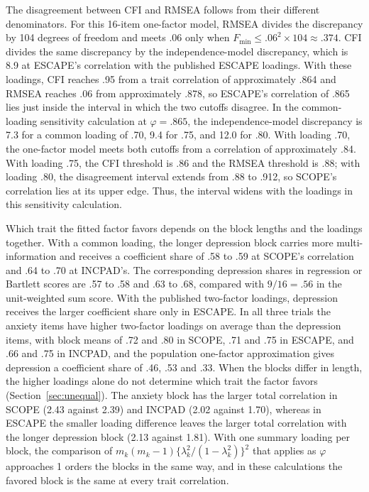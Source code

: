 The disagreement between CFI and RMSEA follows from their different denominators. For this 16-item one-factor model, RMSEA divides the discrepancy by 104 degrees of freedom and meets .06 only when $F_{\min}\le.06^2\times104\approx.374$. CFI divides the same discrepancy by the independence-model discrepancy, which is 8.9 at ESCAPE's correlation with the published ESCAPE loadings. With these loadings, CFI reaches .95 from a trait correlation of approximately .864 and RMSEA reaches .06 from approximately .878, so ESCAPE's correlation of .865 lies just inside the interval in which the two cutoffs disagree. In the common-loading sensitivity calculation at $\varphi=.865$, the independence-model discrepancy is 7.3 for a common loading of .70, 9.4 for .75, and 12.0 for .80. With loading .70, the one-factor model meets both cutoffs from a correlation of approximately .84. With loading .75, the CFI threshold is .86 and the RMSEA threshold is .88; with loading .80, the disagreement interval extends from .88 to .912, so SCOPE's correlation lies at its upper edge. Thus, the interval widens with the loadings in this sensitivity calculation.

Which trait the fitted factor favors depends on the block lengths and the loadings together. With a common loading, the longer depression block carries more multi-information and receives a coefficient share of .58 to .59 at SCOPE's correlation and .64 to .70 at INCPAD's. The corresponding depression shares in regression or Bartlett scores are .57 to .58 and .63 to .68, compared with $9/16=.56$ in the unit-weighted sum score. With the published two-factor loadings, depression receives the larger coefficient share only in ESCAPE. In all three trials the anxiety items have higher two-factor loadings on average than the depression items, with block means of .72 and .80 in SCOPE, .71 and .75 in ESCAPE, and .66 and .75 in INCPAD, and the population one-factor approximation gives depression a coefficient share of .46, .53 and .33. When the blocks differ in length, the higher loadings alone do not determine which trait the factor favors (Section~\ref{sec:unequal}). The anxiety block has the larger total correlation in SCOPE (2.43 against 2.39) and INCPAD (2.02 against 1.70), whereas in ESCAPE the smaller loading difference leaves the larger total correlation with the longer depression block (2.13 against 1.81). With one summary loading per block, the comparison of $m_k(m_k-1)\{\lambda_k^2/(1-\lambda_k^2)\}^2$ that applies as $\varphi$ approaches 1 orders the blocks in the same way, and in these calculations the favored block is the same at every trait correlation.


